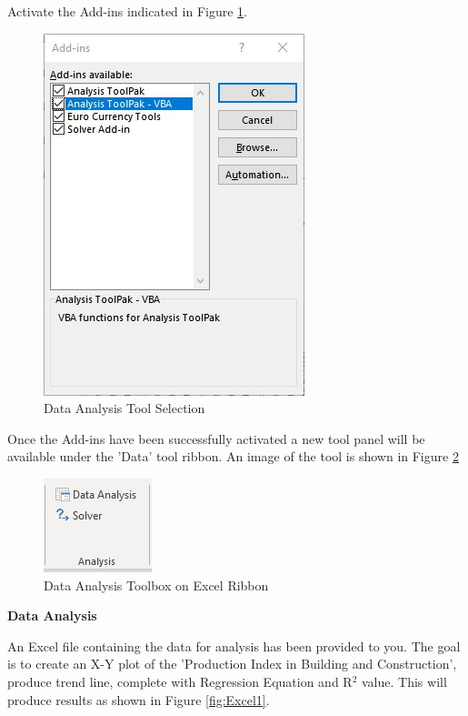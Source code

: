 Activate the Add-ins indicated in Figure \ref{fig:AddInSelection}.\\

\begin{figure}
	\centering
	\includegraphics[width=0.6\linewidth]{./img/AddInSelection.jpg}
	\caption{Data Analysis Tool Selection}
	\label{fig:AddInSelection}
\end{figure}


Once the Add-ins have been successfully activated a new tool panel will be available under the 'Data' tool ribbon.  An image of the tool is shown in Figure \ref{fig:DataAnalysisTools}\\

\begin{figure}
	\centering
	\includegraphics[width=0.25\linewidth]{./img/DataAnalysisTools.jpg}
	\caption{Data Analysis Toolbox on Excel Ribbon}
	\label{fig:DataAnalysisTools}
\end{figure}

\newpage

\textbf{Data Analysis}

An Excel file containing the data for analysis has been provided to you.  The goal is to create an X-Y plot of the 'Production Index in Building and Construction', produce trend line, complete with Regression Equation and R$^{2}$ value.  This will produce results as shown in Figure \ref{fig:Excel1}.\\


